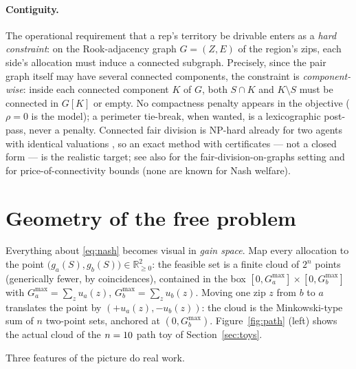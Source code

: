 \documentclass[11pt]{article}
\theoremstyle{definition}
\newcommand{\ga}{g_a}
\newcommand{\gb}{g_b}
\newcommand{\ua}{u_a}
\newcommand{\ub}{u_b}
\begin{document}
\paragraph{Contiguity.}
The operational requirement that a rep's territory be drivable enters as a \emph{hard
constraint}: on the Rook-adjacency graph $G=(Z,E)$ of the region's zips, each side's
allocation must induce a connected subgraph. Precisely, since the pair graph itself may
have several connected components, the constraint is \emph{component-wise}: inside each
connected component $K$ of $G$, both $S\cap K$ and $K\setminus S$ must be connected in
$G[K]$ or empty. No compactness penalty appears in the objective ($\rho=0$ is the
model); a perimeter tie-break, when wanted, is a lexicographic post-pass, never a
penalty. Connected fair division is NP-hard already for two agents with identical
valuations \citep{deligkas2021}, so an exact method with certificates --- not a closed
form --- is the realistic target; see also \citet{bouveret2017,bilo2022} for the
fair-division-on-graphs setting and \citet{bei2022} for price-of-connectivity bounds
(none are known for Nash welfare).

\section{Geometry of the free problem}\label{sec:geometry}

Everything about \eqref{eq:nash} becomes visual in \emph{gain space}. Map every
allocation to the point $\big(\ga(S),\gb(S)\big)\in\mathbb{R}^2_{\ge0}$: the feasible
set is a finite cloud of $2^n$ points (generically fewer, by coincidences), contained in
the box $[0,G_a^{\max}]\times[0,G_b^{\max}]$ with $G_a^{\max}=\sum_z\ua(z)$,
$G_b^{\max}=\sum_z\ub(z)$. Moving one zip $z$ from $b$ to $a$ translates the point by
$(+\ua(z),-\ub(z))$: the cloud is the Minkowski-type sum of $n$ two-point sets, anchored
at $(0,G_b^{\max})$. Figure~\ref{fig:path} (left) shows the actual cloud of the
$n=10$ path toy of Section~\ref{sec:toys}.

Three features of the picture do real work.
\end{document}
